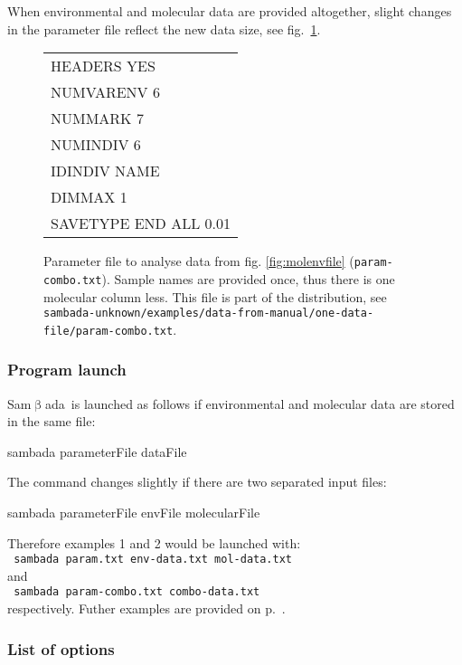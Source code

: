 \documentclass[a4paper,11pt]{article}
\newcommand{\versionnumber}{unknown}
\newcommand{\smb}{\textsf{Sam$\upbeta$ada}}
\newcommand{\pathtodatafrommanual}{\texttt{sambada-\versionnumber/examples/data-from-manual/}}
\newcommand{\pathtoonedatafile}{\pathtodatafrommanual\texttt{one-data-file/}}
\newenvironment{launch}{\begin{mdframed}\ttfamily}{\end{mdframed}}
\begin{document}
When environmental and molecular data are provided altogether, slight changes in the parameter file reflect the new data size, see fig.~\ref{fig:fichier-param-combo}.
\begin{figure}[htbp]
\centering
\ttfamily
\begin{tabular}{|l|}
\hline
HEADERS YES\\	
NUMVARENV 6\\	
NUMMARK 7	\\
NUMINDIV 6\\
IDINDIV NAME\\
DIMMAX 1\\
SAVETYPE END ALL 0.01\\
\hline
\end{tabular}%
\caption{Parameter file to analyse data from fig. \ref{fig:molenvfile} (\texttt{param-combo.txt}).
Sample names are provided once, thus there is one molecular column less.
This file is part of the distribution, see \pathtoonedatafile\texttt{param-combo.txt}.
}
\label{fig:fichier-param-combo}
\end{figure}


\subsubsection{Program launch}

\smb\ is launched as follows if environmental and molecular data are stored in the same file:
\begin{launch} sambada parameterFile dataFile\end{launch}
The command changes slightly if there are two separated input files:\\
\begin{launch} sambada parameterFile envFile molecularFile \end{launch}

\noindent Therefore examples 1 and 2 would be launched with:\\
\verb+ sambada param.txt env-data.txt mol-data.txt+\\
and\\
\verb+ sambada param-combo.txt combo-data.txt+\\
respectively.
Futher examples are provided on p.~\pageref{sec:examples-launch}.

\subsubsection{List of options\label{seq:liste-options}}
\end{document}
